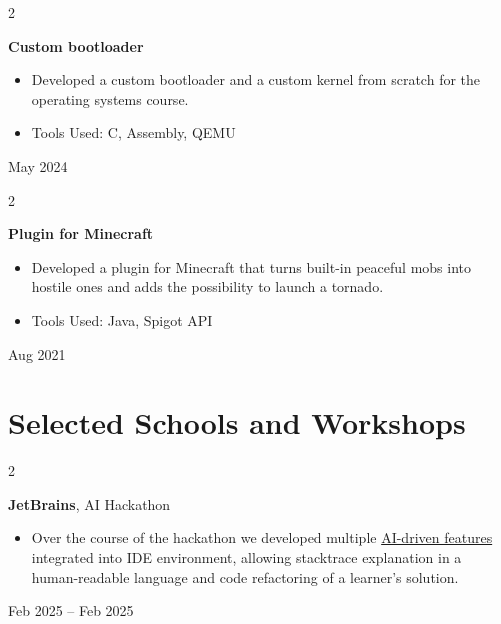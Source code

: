 \documentclass[10pt, letterpaper]{article}
\newenvironment{highlights}{
    \begin{itemize}[
        topsep=0.10 cm,
        parsep=0.10 cm,
        partopsep=0pt,
        itemsep=0pt,
        leftmargin=0.4 cm + 10pt
    ]
}{
    \end{itemize}
} %
\newenvironment{twocolentry}[2][]{
    \onecolentry
    \def\secondColumn{#2}
    \setcolumnwidth{\fill, 4.5 cm}
    \begin{paracol}{2}
}{
    \switchcolumn \raggedleft \secondColumn
    \end{paracol}
    \endonecolentry
} %
\begin{document}
        \vspace{0.2 cm}

        \begin{twocolentry}{
            May 2024
        }
            \textbf{Custom bootloader}
            \begin{highlights}
                \item Developed a custom bootloader and a custom kernel from scratch for the operating systems course.
                \item Tools Used: C, Assembly, QEMU
            \end{highlights}
        \end{twocolentry}


        \vspace{0.2 cm}

        \begin{twocolentry}{
            Aug 2021
        }
            \textbf{Plugin for Minecraft}
            \begin{highlights}
                \item Developed a plugin for Minecraft that turns built-in peaceful mobs into hostile ones and adds the possibility to launch a tornado.
                \item Tools Used: Java, Spigot API
            \end{highlights}
        \end{twocolentry}



    
    \section{Selected Schools and Workshops}



        
        \begin{twocolentry}{
            Feb 2025 – Feb 2025
        }
            \textbf{JetBrains}, AI Hackathon
            \begin{highlights}
                \item Over the course of the hackathon we developed multiple \href{https://github.com/JetBrains/educational-plugin/tree/ai-hackathon-features}{AI-driven features} integrated into IDE environment, allowing stacktrace explanation in a human-readable language and code refactoring of a learner's solution.
            \end{highlights}
        \end{twocolentry}
\end{document}
